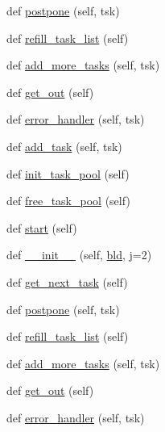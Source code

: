 \begin{DoxyCompactItemize}
def \hyperlink{classwaflib_1_1_runner_1_1_parallel_ab025fd073c2f52e72df1a3bc8d188d0e}{postpone} (self, tsk)
\item 
def \hyperlink{classwaflib_1_1_runner_1_1_parallel_a2f7785b4be91f45b53a9f294fb3a990e}{refill\+\_\+task\+\_\+list} (self)
\item 
def \hyperlink{classwaflib_1_1_runner_1_1_parallel_a7501769205be6d24343c054f46e43289}{add\+\_\+more\+\_\+tasks} (self, tsk)
\item 
def \hyperlink{classwaflib_1_1_runner_1_1_parallel_aa5803cc70ce58b6f1ed09d8e4414aeef}{get\+\_\+out} (self)
\item 
def \hyperlink{classwaflib_1_1_runner_1_1_parallel_a5687053d52ada326ac8754dc15bd5138}{error\+\_\+handler} (self, tsk)
\item 
def \hyperlink{classwaflib_1_1_runner_1_1_parallel_a7b6dec41418a4eb5a39aa35756ef39c6}{add\+\_\+task} (self, tsk)
\item 
def \hyperlink{classwaflib_1_1_runner_1_1_parallel_a847fede29cb9dfe31b6b694e1044d100}{init\+\_\+task\+\_\+pool} (self)
\item 
def \hyperlink{classwaflib_1_1_runner_1_1_parallel_aed9785fdb3b1d54bbdc5520942ebe237}{free\+\_\+task\+\_\+pool} (self)
\item 
def \hyperlink{classwaflib_1_1_runner_1_1_parallel_a091adebadfabd759640c7347de4b05e2}{start} (self)
\item 
def \hyperlink{classwaflib_1_1_runner_1_1_parallel_a0c0a52852b556178d86233e354383f51}{\+\_\+\+\_\+init\+\_\+\+\_\+} (self, \hyperlink{classwaflib_1_1_runner_1_1_parallel_a710f2069db915f1b04538ed7989511ff}{bld}, j=2)
\item 
def \hyperlink{classwaflib_1_1_runner_1_1_parallel_a13620afd7fb0dac47215c1a434c3a79a}{get\+\_\+next\+\_\+task} (self)
\item 
def \hyperlink{classwaflib_1_1_runner_1_1_parallel_ab025fd073c2f52e72df1a3bc8d188d0e}{postpone} (self, tsk)
\item 
def \hyperlink{classwaflib_1_1_runner_1_1_parallel_a2f7785b4be91f45b53a9f294fb3a990e}{refill\+\_\+task\+\_\+list} (self)
\item 
def \hyperlink{classwaflib_1_1_runner_1_1_parallel_a7501769205be6d24343c054f46e43289}{add\+\_\+more\+\_\+tasks} (self, tsk)
\item 
def \hyperlink{classwaflib_1_1_runner_1_1_parallel_aa5803cc70ce58b6f1ed09d8e4414aeef}{get\+\_\+out} (self)
\item 
def \hyperlink{classwaflib_1_1_runner_1_1_parallel_a5687053d52ada326ac8754dc15bd5138}{error\+\_\+handler} (self, tsk)

\end{DoxyCompactItemize}
